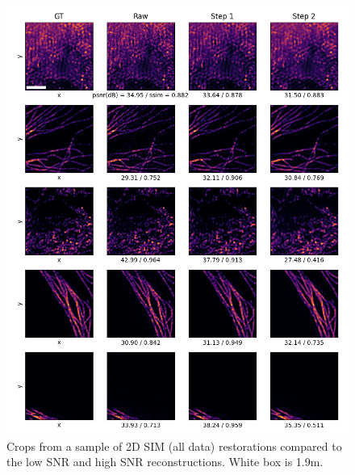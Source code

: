 \documentclass[12pt]{article}
\begin{document}
\begin{figure}[hbtp]
    \includegraphics[scale=0.8, center]{figures/m023_m024_reconstruction_samples.png}
    \caption{Crops from a sample of 2D SIM (all data) restorations compared to the low SNR and high SNR reconstructions.
    White box is 1.9\textmu m.}
    \label{fig:2D_further_samples}
\end{figure}
\end{document}
